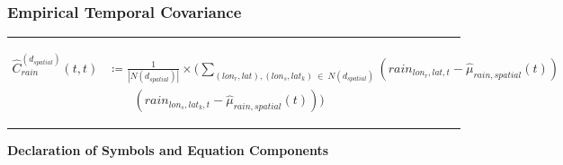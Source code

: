 \documentclass[
  12pt,
]{article}
\begin{document}
\clearpage

\hypertarget{empirical-temporal-covariance}{%
\subsubsection{Empirical Temporal
Covariance}\label{empirical-temporal-covariance}}

\rule{1\linewidth}{0.5pt}

\begin{equation}\label{eq:empirical_temporal_covariance_function_equation}
\begin{aligned}
\widehat{C}_{rain}^{\left(d_{spatial}\right)}\left(t,t\right)&\coloneqq\frac{1}{|N(d_{spatial})|}\times\Bigg(\sum_{(lon_r,lat),(lon_s,lat_k)\:\in\:N(d_{spatial})}\left(rain_{lon_r,lat,t}-\widehat{\mu}_{rain,spatial}(t)\right) \\ 
&\qquad\left(rain_{lon_s,lat_k,t}-\widehat{\mu}_{rain,spatial}(t)\right)\Bigg)
\end{aligned}
\end{equation}

\citet{Cressie.2011} \textbar{} \citet{Wikle.2019} \textbar{}
\citet{Auer.2020}

\rule{1\linewidth}{0.5pt}

\begin{center}
\textbf{Declaration of Symbols and Equation Components}
\end{center}
\end{document}
